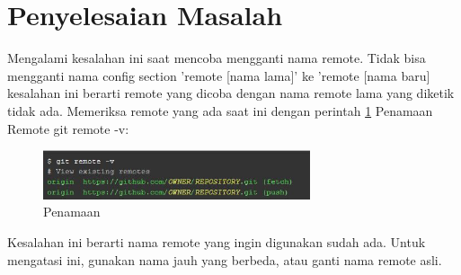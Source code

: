 \section{Penyelesaian Masalah}
\hspace*{0.5in} Mengalami kesalahan ini saat mencoba mengganti nama remote. Tidak bisa mengganti nama config section 'remote [nama lama]' ke 'remote [nama baru] kesalahan ini berarti remote yang dicoba dengan nama remote lama yang diketik tidak ada. Memeriksa remote yang ada saat ini dengan perintah \ref{Penamaan} Penamaan Remote git remote -v:
\begin{figure}[ht]
	\centerline{\includegraphics[width=0.70\textwidth]{Figures/Penamaan}}
	\caption{Penamaan}
	\label{Penamaan}
\end{figure}

\hspace*{0.5in} Kesalahan ini berarti nama remote yang ingin digunakan sudah ada. Untuk mengatasi ini, gunakan nama jauh yang berbeda, atau ganti nama remote asli.
